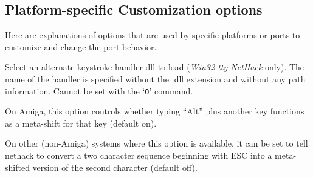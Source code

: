 \subsection*{Platform-specific Customization options}

Here are explanations of options that are used by specific platforms 
or ports to customize and change the port behavior.

\blist{}
\item[\ib{altkeyhandler}]
Select an alternate keystroke handler dll to load ({\it Win32 tty\/ NetHack\/} only).
The name of the handler is specified without the .dll extension and without any
path information.
Cannot be set with the `{\tt O}' command.
\item[\ib{altmeta}]
On Amiga, this option controls whether typing ``Alt'' plus another key
functions as a meta-shift for that key (default on).
\item[\ib{altmeta}]
On other (non-Amiga) systems where this option is available, it can be
set to tell nethack to convert a two character sequence beginning with
ESC into a meta-shifted version of the second character (default off).

